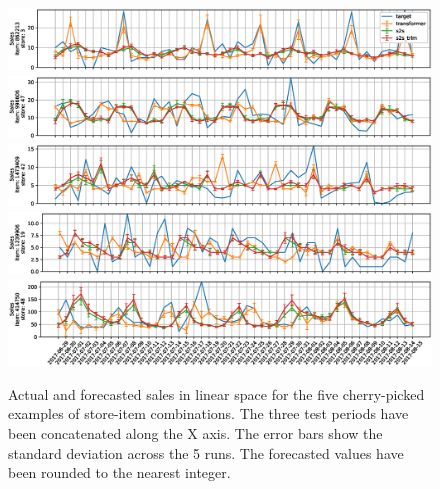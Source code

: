 \documentclass{elsarticle}
\begin{document}
	\begin{figure}
	\centering
	\includegraphics[width=1\linewidth]{img/sample_0_lin}
	\includegraphics[width=1\linewidth]{img/sample_1_lin}
	\includegraphics[width=1\linewidth]{img/sample_2_lin}
	\includegraphics[width=1\linewidth]{img/sample_3_lin}
	\includegraphics[width=1\linewidth]{img/sample_4_lin}
	\caption{Actual and forecasted sales in linear space for the five cherry-picked examples of store-item combinations. The three test periods have been concatenated along the X axis. The error bars show the standard deviation across the 5 runs. The forecasted values  have been rounded to the nearest integer.}
	\label{fig:ts_lin}
\end{figure}
	
\end{document}
